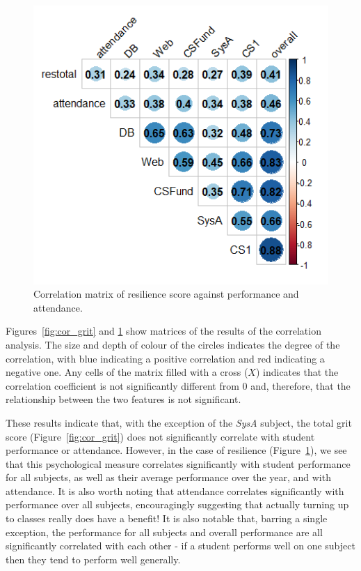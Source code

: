 \documentclass[sigconf]{acmart}
\begin{document}
\begin{figure} [h]
\centering
\includegraphics[width=.98\linewidth]{images/cor_plot_res.png}
\caption{Correlation matrix of resilience score against performance and attendance.}
\label{fig:cor_res} 
\end{figure}

Figures~\ref{fig:cor_grit} and \ref{fig:cor_res} show matrices of the results of the correlation analysis. The size and depth of colour of the circles indicates the degree of the correlation, with blue indicating a positive correlation and red indicating a negative one. Any cells of the matrix filled with a cross ($X$) indicates that the correlation coefficient is not significantly different from 0 and, therefore, that the relationship between the two features is not significant.

These results indicate that, with the exception of the {\em SysA} subject, the total grit score (Figure~\ref{fig:cor_grit}) does not significantly correlate with student performance or attendance. However, in the case of resilience (Figure~\ref{fig:cor_res}), we see that this psychological measure correlates significantly with student performance for all subjects, as well as their average performance over the year, and with attendance. It is also worth noting that attendance correlates significantly with performance over all subjects, encouragingly suggesting that actually turning up to classes really does have a benefit! It is also notable that, barring a single exception, the performance for all subjects and overall performance are all significantly correlated with each other - if a student performs well on one subject then they tend to perform well generally. 
\end{document}
